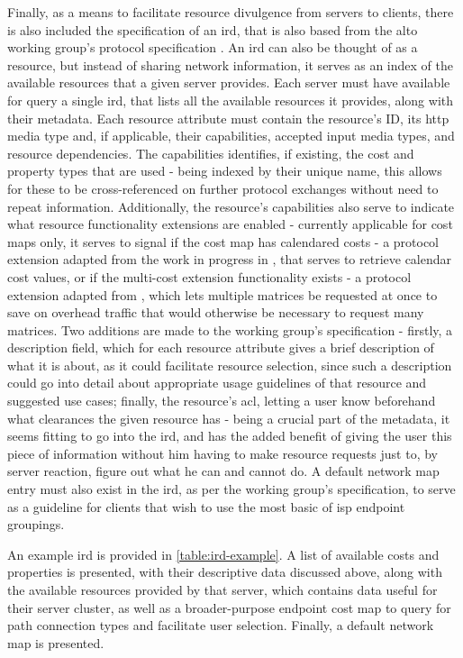     Finally, as a means to facilitate resource divulgence from servers to clients, there is also included the specification of an \gls{ird}, that is also based from the \gls{alto} working group's protocol specification \cite{alto-protocol}.
    An \gls{ird} can also be thought of as a resource, but instead of sharing network information, it serves as an index of the available resources that a given server provides.
    Each server must have available for query a single \gls{ird}, that lists all the available resources it provides, along with their metadata.
    Each resource attribute must contain the resource's ID, its \gls{http} media type and, if applicable, their capabilities, accepted input media types, and resource dependencies.
    The capabilities identifies, if existing, the cost and property types that are used - being indexed by their unique name, this allows for these to be cross-referenced on further protocol exchanges without need to repeat information.
    Additionally, the resource's capabilities also serve to indicate what resource functionality extensions are enabled - currently applicable for cost maps only, it serves to signal if the cost map has calendared costs - a protocol extension adapted from the work in progress in \cite{alto-calendar-cost-map}, that serves to retrieve calendar cost values, or if the multi-cost extension functionality exists - a protocol extension adapted from \cite{alto-multi-cost}, which lets multiple matrices be requested at once to save on overhead traffic that would otherwise be necessary to request many matrices.
    Two additions are made to the working group's specification - firstly, a description field, which for each resource attribute gives a brief description of what it is about, as it could facilitate resource selection, since such a description could go into detail about appropriate usage guidelines of that resource and suggested use cases; finally, the resource's \gls{acl}, letting a user know beforehand what clearances the given resource has - being a crucial part of the metadata, it seems fitting to go into the \gls{ird}, and has the added benefit of giving the user this piece of information without him having to make resource requests just to, by server reaction, figure out what he can and cannot do.
    A default network map entry must also exist in the \gls{ird}, as per the working group's specification, to serve as a guideline for clients that wish to use the most basic of \gls{isp} endpoint groupings.

    An example \gls{ird} is provided in \ref{table:ird-example}.
    A list of available costs and properties is presented, with their descriptive data discussed above, along with the available resources provided by that server, which contains data useful for their server cluster, as well as a broader-purpose endpoint cost map to query for path connection types and facilitate user selection.
    Finally, a default network map is presented.

